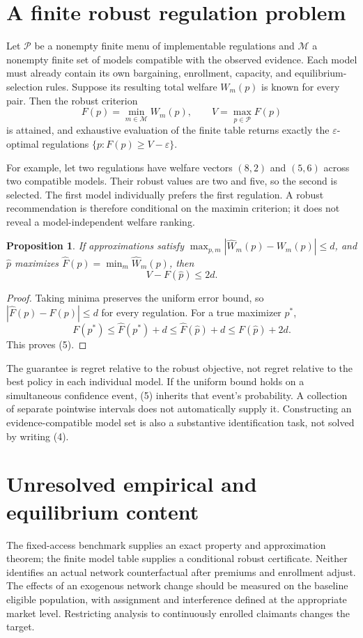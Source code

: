 \documentclass[11pt,a4paper]{article}
\newtheorem{proposition}[theorem]{Proposition}
\begin{document}
\section{A finite robust regulation problem}
Let $\mathcal P$ be a nonempty finite menu of implementable regulations and $\mathcal M$ a nonempty finite set of models compatible with the observed evidence. Each model must already contain its own bargaining, enrollment, capacity, and equilibrium-selection rules. Suppose its resulting total welfare $W_m(p)$ is known for every pair. Then the robust criterion
\[
 F(p)=\min_{m\in\mathcal M}W_m(p),\qquad
 V=\max_{p\in\mathcal P}F(p)
 \tag{4}
\]
is attained, and exhaustive evaluation of the finite table returns exactly the
$\varepsilon$-optimal regulations $\{p:F(p)\ge V-\varepsilon\}$.

For example, let two regulations have welfare vectors $(8,2)$ and $(5,6)$ across two compatible models. Their robust values are two and five, so the second is selected. The first model individually prefers the first regulation. A robust recommendation is therefore conditional on the maximin criterion; it does not reveal a model-independent welfare ranking.

\begin{proposition}
If approximations satisfy
$\max_{p,m}|\widehat W_m(p)-W_m(p)|\le d$,
and $\widehat p$ maximizes $\widehat F(p)=\min_m\widehat W_m(p)$, then
\[
 V-F(\widehat p)\le2d.
 \tag{5}
\]
\end{proposition}
\begin{proof}
Taking minima preserves the uniform error bound, so
$|\widehat F(p)-F(p)|\le d$ for every regulation. For a true maximizer $p^*$,
\[
 F(p^*)\le\widehat F(p^*)+d
 \le\widehat F(\widehat p)+d
 \le F(\widehat p)+2d.
\]
This proves (5).
\end{proof}
The guarantee is regret relative to the robust objective, not regret relative to the best policy in each individual model. If the uniform bound holds on a simultaneous confidence event, (5) inherits that event's probability. A collection of separate pointwise intervals does not automatically supply it. Constructing an evidence-compatible model set is also a substantive identification task, not solved by writing (4).
\section{Unresolved empirical and equilibrium content}
The fixed-access benchmark supplies an exact property and approximation theorem; the finite model table supplies a conditional robust certificate. Neither identifies an actual network counterfactual after premiums and enrollment adjust. The effects of an exogenous network change should be measured on the baseline eligible population, with assignment and interference defined at the appropriate market level. Restricting analysis to continuously enrolled claimants changes the target.
\end{document}
